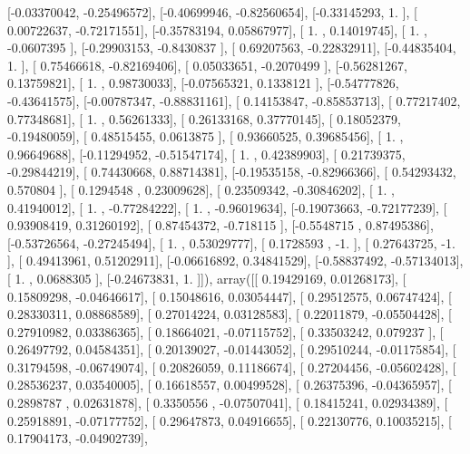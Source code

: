 \documentclass{article}
\begin{document}
       [-0.03370042, -0.25496572],
       [-0.40699946, -0.82560654],
       [-0.33145293,  1.        ],
       [ 0.00722637, -0.72171551],
       [-0.35783194,  0.05867977],
       [ 1.        ,  0.14019745],
       [ 1.        , -0.0607395 ],
       [-0.29903153, -0.8430837 ],
       [ 0.69207563, -0.22832911],
       [-0.44835404,  1.        ],
       [ 0.75466618, -0.82169406],
       [ 0.05033651, -0.2070499 ],
       [-0.56281267,  0.13759821],
       [ 1.        ,  0.98730033],
       [-0.07565321,  0.1338121 ],
       [-0.54777826, -0.43641575],
       [-0.00787347, -0.88831161],
       [ 0.14153847, -0.85853713],
       [ 0.77217402,  0.77348681],
       [ 1.        ,  0.56261333],
       [ 0.26133168,  0.37770145],
       [ 0.18052379, -0.19480059],
       [ 0.48515455,  0.0613875 ],
       [ 0.93660525,  0.39685456],
       [ 1.        ,  0.96649688],
       [-0.11294952, -0.51547174],
       [ 1.        ,  0.42389903],
       [ 0.21739375, -0.29844219],
       [ 0.74430668,  0.88714381],
       [-0.19535158, -0.82966366],
       [ 0.54293432,  0.570804  ],
       [ 0.1294548 ,  0.23009628],
       [ 0.23509342, -0.30846202],
       [ 1.        ,  0.41940012],
       [ 1.        , -0.77284222],
       [ 1.        , -0.96019634],
       [-0.19073663, -0.72177239],
       [ 0.93908419,  0.31260192],
       [ 0.87454372, -0.718115  ],
       [-0.5548715 ,  0.87495386],
       [-0.53726564, -0.27245494],
       [ 1.        ,  0.53029777],
       [ 0.1728593 , -1.        ],
       [ 0.27643725, -1.        ],
       [ 0.49413961,  0.51202911],
       [-0.06616892,  0.34841529],
       [-0.58837492, -0.57134013],
       [ 1.        ,  0.0688305 ],
       [-0.24673831,  1.        ]]), array([[ 0.19429169,  0.01268173],
       [ 0.15809298, -0.04646617],
       [ 0.15048616,  0.03054447],
       [ 0.29512575,  0.06747424],
       [ 0.28330311,  0.08868589],
       [ 0.27014224,  0.03128583],
       [ 0.22011879, -0.05504428],
       [ 0.27910982,  0.03386365],
       [ 0.18664021, -0.07115752],
       [ 0.33503242,  0.079237  ],
       [ 0.26497792,  0.04584351],
       [ 0.20139027, -0.01443052],
       [ 0.29510244, -0.01175854],
       [ 0.31794598, -0.06749074],
       [ 0.20826059,  0.11186674],
       [ 0.27204456, -0.05602428],
       [ 0.28536237,  0.03540005],
       [ 0.16618557,  0.00499528],
       [ 0.26375396, -0.04365957],
       [ 0.2898787 ,  0.02631878],
       [ 0.3350556 , -0.07507041],
       [ 0.18415241,  0.02934389],
       [ 0.25918891, -0.07177752],
       [ 0.29647873,  0.04916655],
       [ 0.22130776,  0.10035215],
       [ 0.17904173, -0.04902739],
\end{document}
